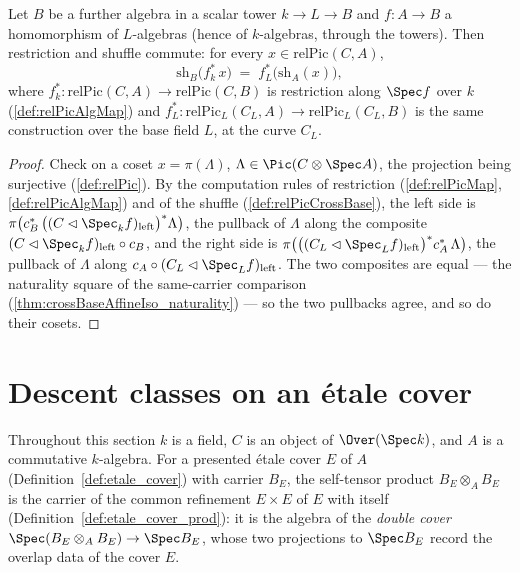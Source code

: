 \begin{theorem}
  \label{thm:relPicCrossBase_relPicAlgMap}
  \leanok
  Let \(B\) be a further algebra in a scalar tower \(k \to L \to B\) and
  \(f : A \to B\) a homomorphism of \(L\)-algebras (hence of \(k\)-algebras, through
  the towers). Then restriction and shuffle commute: for every
  \(x \in \mathrm{relPic}(C,A)\),
  \[
    \mathrm{sh}_B\bigl(f^{*}_{k}\, x\bigr) \;=\; f^{*}_{L}\bigl(\mathrm{sh}_A(x)\bigr),
  \]
  where \(f^{*}_{k} : \mathrm{relPic}(C,A) \to \mathrm{relPic}(C,B)\) is restriction
  along \(\Spec f\) over \(k\) (\ref{def:relPicAlgMap}) and
  \(f^{*}_{L} : \mathrm{relPic}_L(C_L,A) \to \mathrm{relPic}_L(C_L,B)\) is the same
  construction over the base field \(L\), at the curve \(C_L\).
\end{theorem}
\begin{proof}
  \leanok
  Check on a coset \(x = \pi(\Lambda)\), \(\Lambda \in \Pic(C \otimes \Spec A)\), the
  projection being surjective (\ref{def:relPic}). By the computation rules of
  restriction (\ref{def:relPicMap}, \ref{def:relPicAlgMap}) and of the shuffle
  (\ref{def:relPicCrossBase}), the left side is
  \(\pi\bigl(c_B^{*}\,\bigl((C \lhd \Spec_k f)_{\mathrm{left}}\bigr)^{*}\Lambda\bigr)\),
  the pullback of \(\Lambda\) along the composite
  \((C \lhd \Spec_k f)_{\mathrm{left}} \circ c_B\), and the right side is
  \(\pi\bigl(\bigl((C_L \lhd \Spec_L f)_{\mathrm{left}}\bigr)^{*} c_A^{*}\,
  \Lambda\bigr)\), the pullback of \(\Lambda\) along
  \(c_A \circ (C_L \lhd \Spec_L f)_{\mathrm{left}}\). The two composites are equal ---
  the naturality square of the same-carrier comparison
  (\ref{thm:crossBaseAffineIso_naturality}) --- so the two pullbacks agree, and so do
  their cosets.
\end{proof}

\section{Descent classes on an \'etale cover}

Throughout this section \(k\) is a field, \(C\) is an object of \(\Over(\Spec k)\), and \(A\) is
a commutative \(k\)-algebra. For a presented \'etale cover \(E\) of \(A\)
(Definition~\ref{def:etale_cover}) with carrier \(B_E\), the self-tensor product
\(B_E \otimes_A B_E\) is the carrier of the common refinement \(E \times E\) of \(E\) with
itself (Definition~\ref{def:etale_cover_prod}): it is the algebra of the \emph{double cover}
\(\Spec(B_E \otimes_A B_E) \to \Spec B_E\), whose two projections to \(\Spec B_E\) record the
overlap data of the cover \(E\).

